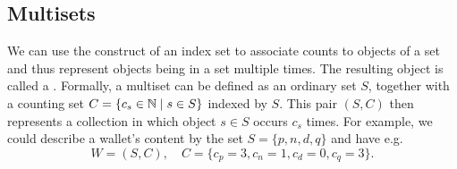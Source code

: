 \subsection{Multisets}
\label{secmultiset}

We can use the construct of an index set to associate counts to objects of a
set and thus represent objects being in a set multiple times. The resulting
object is called a . Formally, a multiset can be defined as
an ordinary set $S$, together with a counting set $C=\{c_s\in{\mathbb N}\mid s\in
S\}$ indexed by $S$. This pair $(S,C)$ then represents a collection in which
object $s\in S$ occurs  $c_s$ times. For example, we could describe a
wallet's content by the set $S=\{p,n,d,q\}$ 
and have e.g. 
\[
W=(S,C),\quad C=\{c_p=3,c_n=1,c_d=0,c_q=3\}.
\]
